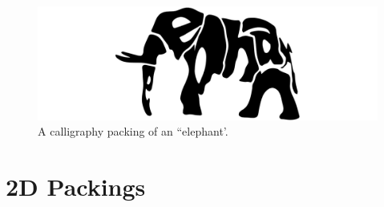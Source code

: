 \begin{figure}[t!]
\centering
\includegraphics[width=1.0\textwidth]{figures/related/calligraphy.pdf} 
\caption[A calligraphy packing of an ``elephant'']
{\label{fig_calligraphy} 
A calligraphy packing of an ``elephant'.}
\end{figure}


\section{2D Packings}


